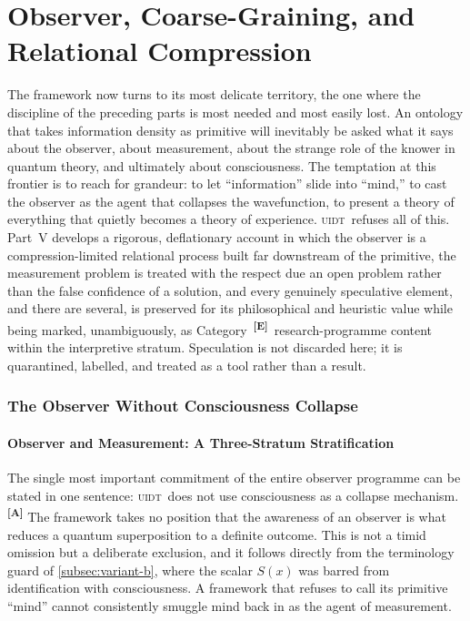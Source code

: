 \documentclass[12pt,a4paper,twoside]{article}
\theoremstyle{plain}
\theoremstyle{definition}
\theoremstyle{remark}
\newcommand{\UIDT}{\textsc{uidt}}
\newcommand{\catmark}[1]{\textsuperscript{\textsf{\textbf{[#1]}}}}
\begin{document}
\newpage
\part{Observer, Coarse-Graining, and Relational Compression}
\label{part:observer}

\noindent The framework now turns to its most delicate territory, the one where the discipline of the preceding parts is most needed and most easily lost. An ontology that takes information density as primitive will inevitably be asked what it says about the observer, about measurement, about the strange role of the knower in quantum theory, and ultimately about consciousness. The temptation at this frontier is to reach for grandeur: to let ``information'' slide into ``mind,'' to cast the observer as the agent that collapses the wavefunction, to present a theory of everything that quietly becomes a theory of experience. \UIDT\ refuses all of this. Part~V develops a rigorous, deflationary account in which the observer is a compression-limited relational process built far downstream of the primitive, the measurement problem is treated with the respect due an open problem rather than the false confidence of a solution, and every genuinely speculative element, and there are several, is preserved for its philosophical and heuristic value while being marked, unambiguously, as Category~\catmark{E}\ research-programme content within the interpretive stratum. Speculation is not discarded here; it is quarantined, labelled, and treated as a tool rather than a result.
\newpage
\section{The Observer Without Consciousness Collapse}
\label{sec:observer-no-collapse}

\subsection{Observer and Measurement: A Three-Stratum Stratification}
\label{subsec:observer-stratification}

The single most important commitment of the entire observer programme can be stated in one sentence: \UIDT\ does not use consciousness as a collapse mechanism.\catmark{A} The framework takes no position that the awareness of an observer is what reduces a quantum superposition to a definite outcome. This is not a timid omission but a deliberate exclusion, and it follows directly from the terminology guard of \cref{subsec:variant-b}, where the scalar $S(x)$ was barred from identification with consciousness. A framework that refuses to call its primitive ``mind'' cannot consistently smuggle mind back in as the agent of measurement.
\end{document}

